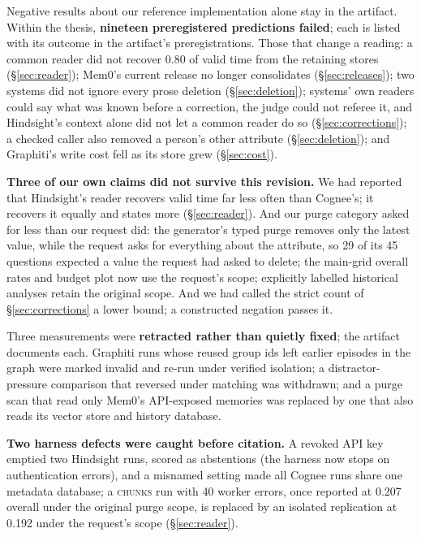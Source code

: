 \documentclass[conference]{IEEEtran}
\begin{document}
Negative results about our reference implementation alone stay in the
artifact. Within the thesis, \textbf{nineteen preregistered predictions
failed}; each is listed with its outcome in the artifact's preregistrations. Those that change a reading: a common reader did
not recover 0.80 of valid time from the retaining stores (\S\ref{sec:reader});
Mem0's current release no longer consolidates (\S\ref{sec:releases}); two
systems did not ignore every prose deletion (\S\ref{sec:deletion}); systems'
own readers could say what was known before a correction, the judge could not
referee it, and Hindsight's context alone did not let a common reader do so
(\S\ref{sec:corrections}); a checked caller also removed a person's other
attribute (\S\ref{sec:deletion}); and Graphiti's write cost fell as its store
grew (\S\ref{sec:cost}).

\textbf{Three of our own claims did not survive this revision.} We had reported
that Hindsight's reader recovers valid time far less often than Cognee's; it
recovers it equally and states more (\S\ref{sec:reader}). And our purge
category asked for less than our request did: the generator's typed purge
removes only the latest value, while the request asks for everything about the
attribute, so 29 of its 45 questions expected a value the request had asked to
delete; the main-grid overall rates and budget plot now use the request's
scope; explicitly labelled historical analyses retain the original scope. And we had called the strict count
of \S\ref{sec:corrections} a lower bound; a constructed negation passes it.

Three measurements were \textbf{retracted rather than quietly fixed}; the
artifact documents each. Graphiti runs whose reused group ids left earlier
episodes in the graph were marked invalid and re-run under verified isolation;
a distractor-pressure comparison that reversed under matching was withdrawn;
and a purge scan that read only Mem0's API-exposed memories was replaced by one
that also reads its vector store and history database.

\textbf{Two harness defects were caught before citation.} A revoked API key
emptied two Hindsight runs, scored as abstentions (the harness now stops on
authentication errors), and a misnamed setting made all Cognee runs share one
metadata database; a \textsc{chunks} run with 40 worker errors, once
reported at 0.207 overall under the original purge scope, is replaced by an
isolated replication at 0.192 under the request's scope
(\S\ref{sec:reader}).
\end{document}
